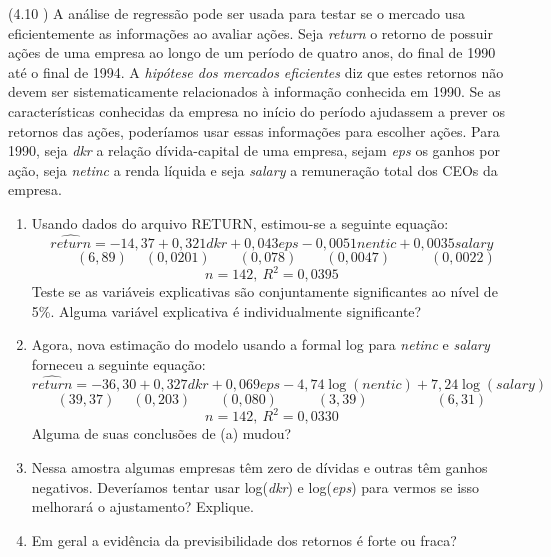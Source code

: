 \documentclass[12pt,letterpaper, onecolumn]{exam}
\begin{document}
\begin{questions}
\question\qstar (4.10 \citep{wooldridge2016}) A análise de regressão pode ser usada para testar se o mercado usa eficientemente as informações ao avaliar ações. Seja \textit{return} o retorno de possuir ações de uma empresa ao longo de um período de quatro anos, do final de 1990 até o final de 1994. A \textit{hipótese dos mercados eficientes} diz que estes retornos não devem ser sistematicamente relacionados à informação conhecida em 1990. Se as características conhecidas da empresa no início do período ajudassem a prever os retornos das ações, poderíamos usar essas informações para escolher ações.
Para 1990, seja \textit{dkr} a relação dívida-capital de uma empresa, sejam \textit{eps} os ganhos por ação, seja \textit{netinc} a renda líquida e seja \textit{salary} a remuneração total dos CEOs da empresa.
\begin{enumerate}[label = (\alph*)]
    \item Usando dados do arquivo RETURN, estimou-se a seguinte equação:
    \begin{equation*}
        \widehat{return} = -14,37 + 0,321dkr + 0,043eps - 0,0051nentic + 0,0035 salary
    \end{equation*}\vspace{-2em}\begin{equation*}
        \phantom{--} (6,89) \phantom{-}(0,0201) \phantom{--} (0,078) \phantom{--} (0,0047) \phantom{---} (0,0022)
    \end{equation*}\begin{equation*}
        n = 142, \ R^2 = 0,0395
    \end{equation*} Teste se as variáveis explicativas são conjuntamente significantes ao nível de 5\%. Alguma variável explicativa é individualmente significante?
    \item Agora, nova estimação do modelo usando a formal log para \textit{netinc} e \textit{salary} forneceu a seguinte equação:    \begin{equation*}
        \widehat{return} = -36,30 + 0,327dkr + 0,069eps - 4,74\log(nentic) + 7,24 \log(salary)
    \end{equation*}\vspace{-2em}\begin{equation*}
        \phantom{} (39,37) \phantom{-}(0,203) \phantom{--} (0,080) \phantom{---} (3,39) \phantom{-----} (6,31)
    \end{equation*}\begin{equation*}
        n = 142, \ R^2 = 0,0330
    \end{equation*}Alguma de suas conclusões de (a) mudou?
    \item Nessa amostra algumas empresas têm zero de dívidas e outras têm ganhos negativos. Deveríamos tentar usar log(\textit{dkr}) e log(\textit{eps}) para vermos se isso melhorará o ajustamento? Explique.
    \item Em geral a evidência da previsibilidade dos retornos é forte ou fraca?
\end{enumerate}
\
\



\end{questions}
\end{document}
